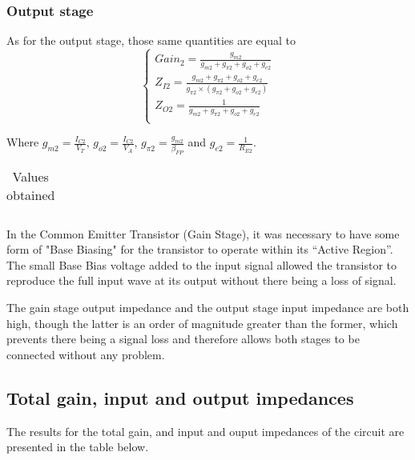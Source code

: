 \subsubsection{Output stage}
As for the output stage, those same quantities are equal to
\begin{equation}
\begin{cases}
Gain_2 = \frac{g_{m2}}{g_{m2}+g_{\pi 2}+g_{o2}+g_{e2}} \\ %
Z_{I2}= \frac{g_{m2}+g_{\pi 2}+g_{o2}+g_{e2}}{g_{\pi 2} \times (g_{\pi 2}+g_{o2}+g_{e2})} \\ %
Z_{O2} = \frac{1}{g_{m2}+g_{\pi 2}+g_{o2}+g_{e2}} \\ %
\end{cases}
\end{equation}

Where $g_{m2} = \frac{I_{C2}}{V_T}$, $g_{o2} = \frac{I_{C2}}{V_A}$, $g_{\pi 2} = \frac{g_{m2}}{\beta_{FP}}$ and $g_{e2} = \frac{1}{R_{E2}}$.

\begin{table}[H]
  \centering
  \begin{tabular}{|c|c|}
    \hline
      
  \end{tabular}
  \caption{Values obtained}
  \label{tab:resultsAC2}
\end{table}

In the Common Emitter Transistor (Gain Stage), it was necessary to have some form of "Base Biasing" for the transistor to operate within its “Active Region”. The small Base Bias voltage added to the input signal allowed the transistor to reproduce the full input wave at its output without there being a loss of signal.

The gain stage output impedance and the output stage input impedance are both high, though the latter is an order of magnitude greater than the former, which prevents there being a signal loss and therefore allows both stages to be connected without any problem.



\subsection{Total gain, input and output impedances}
The results for the total gain, and input and ouput impedances of the circuit are presented in the table below.

